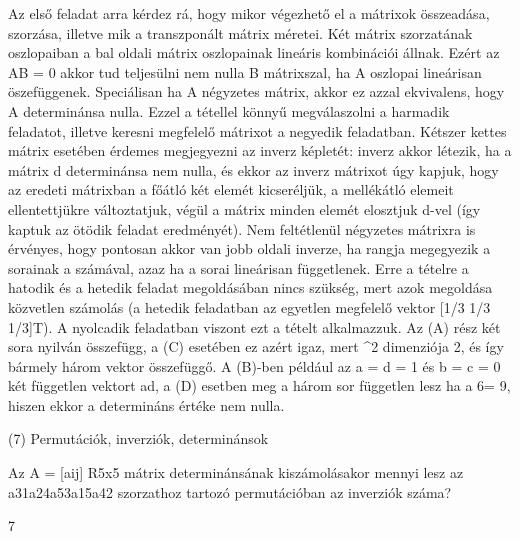 \begin{frame}
  \begin{tcolorbox}[title={6/8. -Q-}]
Az első feladat arra kérdez rá, hogy mikor végezhető el a mátrixok összeadása, szorzása, illetve mik a transzponált mátrix méretei. Két mátrix szorzatának oszlopaiban a bal oldali mátrix oszlopainak lineáris kombinációi állnak. Ezért az AB = 0 akkor tud teljesülni nem nulla B mátrixszal, ha A oszlopai lineárisan öszefüggenek. Speciálisan ha A négyzetes mátrix, akkor ez azzal ekvivalens, hogy A determinánsa nulla. Ezzel a tétellel könnyű megválaszolni a harmadik feladatot, illetve keresni megfelelő mátrixot a negyedik feladatban. Kétszer kettes mátrix esetében érdemes megjegyezni az inverz képletét: inverz akkor létezik, ha a mátrix d determinánsa nem nulla, és ekkor az inverz mátrixot úgy kapjuk, hogy az eredeti mátrixban a főátló két elemét kicseréljük, a mellékátló elemeit ellentettjükre változtatjuk, végül a mátrix minden elemét elosztjuk d-vel (így kaptuk az ötödik feladat eredményét). Nem feltétlenül négyzetes mátrixra is érvényes, hogy pontosan akkor van jobb oldali inverze, ha rangja megegyezik a sorainak a számával, azaz ha a sorai lineárisan függetlenek. Erre a tételre a hatodik és a hetedik feladat megoldásában nincs szükség, mert azok megoldása közvetlen számolás (a hetedik feladatban az egyetlen megfelelő vektor [1/3 1/3 1/3]T). A nyolcadik feladatban viszont ezt a tételt alkalmazzuk. Az (A) rész két sora nyilván összefügg, a (C) esetében ez azért igaz, mert ^2 dimenziója 2, és így bármely három vektor összefüggő. A (B)-ben például az a = d = 1 és b = c = 0 két független vektort ad, a (D) esetben meg a három sor független lesz ha a 6= 9, hiszen ekkor a determináns értéke nem nulla.
  \end{tcolorbox}
\end{frame}


\begin{frame}[plain]
\begin{tcolorbox}[center, colback={myyellow}, coltext={black}, colframe={myyellow}]
    {\RHuge  (7) Permutációk, inverziók, determinánsok}
    \mmedskip
\end{tcolorbox}
\end{frame}

\begin{frame}
  \begin{tcolorbox}[title={7/1. -N-}]
    Az A = [aij] \in R5x5 mátrix determinánsának kiszámolásakor mennyi lesz az a31a24a53a15a42 szorzathoz tartozó permutációban az inverziók száma?

  \tcblower

    \mmedskip 
    
    7
  \end{tcolorbox}
\end{frame}


